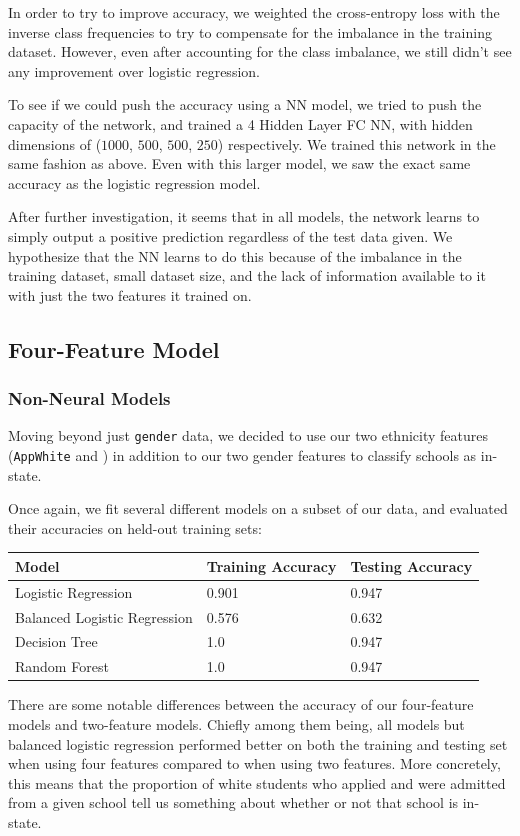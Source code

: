 \documentclass{article}
\begin{document}
In order to try to improve accuracy, we weighted the cross-entropy loss with the inverse class frequencies to try to compensate for the imbalance in the training dataset. However, even after accounting for the class imbalance, we still didn't see any improvement over logistic regression.

To see if we could push the accuracy using a NN model, we tried to push the capacity of the network, and trained a 4 Hidden Layer FC NN, with hidden dimensions of ($1000$, $500$, $500$, $250$) respectively. We trained this network in the same fashion as above. Even with this larger model, we saw the exact same accuracy as the logistic regression model.

After further investigation, it seems that in all models, the network learns to simply output a positive prediction regardless of the test data given. We hypothesize that the NN learns to do this because of the imbalance in the training dataset, small dataset size, and the lack of information available to it with just the two features it trained on.

\subsection{Four-Feature Model}

\subsubsection{Non-Neural Models}

Moving beyond just \texttt{gender} data, we decided to use our two ethnicity features (\texttt{AppWhite} and ) in addition to our two gender features to classify schools as in-state.

Once again, we fit several different models on a subset of our data, and evaluated their accuracies on held-out training sets:

\begin{tabular}{lll}
\toprule
Model &   Training Accuracy &   Testing Accuracy\\
\midrule
Logistic Regression & 0.901 & 0.947 \\
Balanced Logistic Regression & 0.576 & 0.632 \\
Decision Tree & 1.0 & 0.947 \\
Random Forest & 1.0 & 0.947 \\
\bottomrule
\end{tabular}

There are some notable differences between the accuracy of our four-feature models and two-feature models. Chiefly among them being, all models but balanced logistic regression performed better on both the training and testing set when using four features compared to when using two features. More concretely, this means that the proportion of white students who applied and were admitted from a given school tell us something about whether or not that school is in-state.
\end{document}
